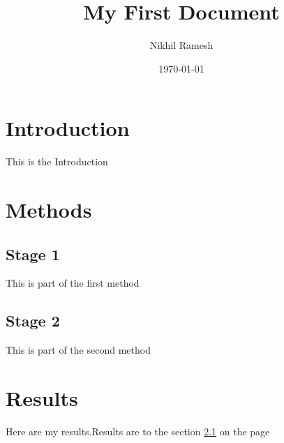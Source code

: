 \documentclass[a4paper,12pt]{article}
\begin{document}
\title{My First Document}
\author{Nikhil Ramesh}
\date{\today}
\maketitle

\section{Introduction}
This is the Introduction 

\section{Methods}

\subsection{Stage 1}
\label{sec1}
This is part of the first method

\subsection{Stage 2}
This is part of the second method

\section{Results}
Here are my results.Results are to the section \ref{sec1} on the page \pageref{sec1}
\end{document}
